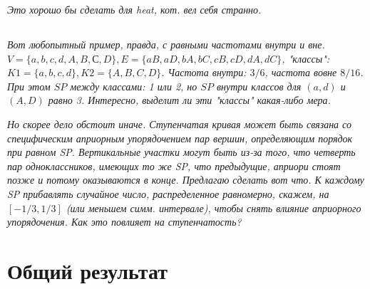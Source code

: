 \documentclass{article}
\begin{document}
\textit{Это хорошо бы сделать для heat, кот. вел себя странно.}


\subsection{}
\textit{Вот любопытный пример, правда, с равными частотами внутри и вне.  $V = \{a, b, c, d, A, B, С, D\}, E = \{aB, aD, bA, bC, cB, cD, dA, dC\}$, "классы": $K1 = \{a, b, c, d\}, K2 = \{A, B, C, D\}$. Частота внутри: $3/6$, частота вовне $8/16$. При этом $SP$ между классами: 1 или 2, но $SP$ внутри классов для $(a, d)$ и $(A, D)$ равно 3. Интересно, выделит ли эти "классы" какая-либо мера.}

\textit{Но скорее дело обстоит иначе. Ступенчатая кривая может быть связана со специфическим априорным упорядочением пар вершин, определяющим порядок при равном SP. Вертикальные участки могут быть из-за того, что четверть пар одноклассников, имеющих то же SP, что предыдущие, априори стоят позже и потому оказываются в конце. Предлагаю сделать вот что. К каждому SP прибавлять случайное число, распределенное равномерно, скажем, на $[-1/3, 1/3]$ (или меньшем симм. интервале), чтобы снять влияние априорного упорядочения. Как это повлияет на ступенчатость?}


\section*{Общий результат}
\end{document}
